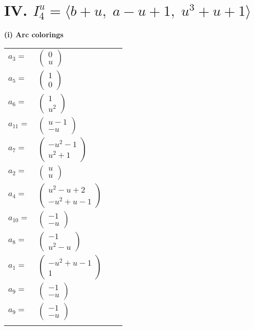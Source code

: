 \documentclass[1p]{elsarticle_modified}
\theoremstyle{definition}
\begin{document}
\centering \section*{IV. $I^u_{4}= \langle b+u,\;a- u+1,\;u^3+u+1 \rangle$}
\flushleft \textbf{(i) Arc colorings}\\
\begin{tabular}{m{7pt} m{180pt} m{7pt} m{180pt} }
\flushright $a_{3}=$&$\begin{pmatrix}0\\u\end{pmatrix}$ \\
\flushright $a_{5}=$&$\begin{pmatrix}1\\0\end{pmatrix}$ \\
\flushright $a_{6}=$&$\begin{pmatrix}1\\u^2\end{pmatrix}$ \\
\flushright $a_{11}=$&$\begin{pmatrix}u-1\\- u\end{pmatrix}$ \\
\flushright $a_{7}=$&$\begin{pmatrix}- u^2-1\\u^2+1\end{pmatrix}$ \\
\flushright $a_{2}=$&$\begin{pmatrix}u\\u\end{pmatrix}$ \\
\flushright $a_{4}=$&$\begin{pmatrix}u^2- u+2\\- u^2+u-1\end{pmatrix}$ \\
\flushright $a_{10}=$&$\begin{pmatrix}-1\\- u\end{pmatrix}$ \\
\flushright $a_{8}=$&$\begin{pmatrix}-1\\u^2- u\end{pmatrix}$ \\
\flushright $a_{1}=$&$\begin{pmatrix}- u^2+u-1\\1\end{pmatrix}$ \\
\flushright $a_{9}=$&$\begin{pmatrix}-1\\- u\end{pmatrix}$\\ \flushright $a_{9}=$&$\begin{pmatrix}-1\\- u\end{pmatrix}$\\&\end{tabular}
\end{document}
